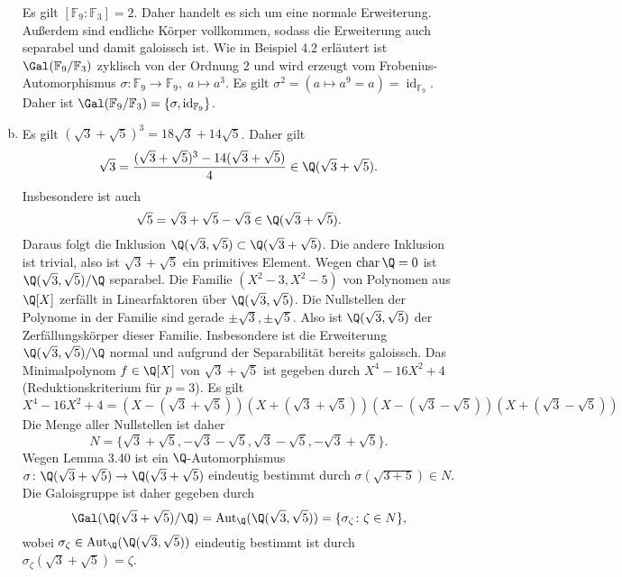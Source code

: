 \documentclass{article}
\begin{document}
\begin{enumerate}[(a)]
        Es gilt $[\mathbb{F}_9\colon \mathbb{F}_3] = 2$. Daher handelt es sich um eine normale Erweiterung. Außerdem sind endliche Körper vollkommen, sodass die Erweiterung auch separabel und damit galoissch ist.
        Wie in Beispiel 4.2 erläutert ist $\Gal(\mathbb{F}_9/\mathbb{F}_3)$ zyklisch von der Ordnung $2$ und wird erzeugt vom Frobenius-Automorphismus $\sigma\colon \mathbb{F}_9 \to \mathbb{F}_9,\; a \mapsto a^3$. Es gilt $\sigma^2 = (a\mapsto a^9 = a) = \operatorname{id}_{\mathbb{F}_9}$. Daher ist $\Gal(\mathbb{F}_9/\mathbb{F}_3) = \{\sigma, \operatorname{id}_{\mathbb{F}_9}\}$.
        \item Es gilt $(\sqrt{3} + \sqrt{5})^3 = 18\sqrt{3} + 14 \sqrt{5}$. 
        Daher gilt $$\sqrt{3} = \frac{(\sqrt{3} + \sqrt{5})^3 - 14(\sqrt{3} + \sqrt{5})}{4} \in \Q(\sqrt{3} + \sqrt{5}).$$ 
        Insbesondere ist auch $$\sqrt{5} = \sqrt{3} + \sqrt{5} - \sqrt{3} \in \Q(\sqrt{3} + \sqrt{5}).$$ Daraus folgt die Inklusion $\Q(\sqrt{3}, \sqrt{5}) \subset \Q(\sqrt{3} + \sqrt{5})$. Die andere Inklusion ist trivial, also ist $\sqrt{3} + \sqrt{5}$ ein primitives Element.
        Wegen $\operatorname{char} \Q = 0$ ist $\Q(\sqrt{3}, \sqrt{5})/\Q$ separabel. 
        Die Familie $(X^2 -3, X^2 - 5)$ von Polynomen aus $\Q[X]$ zerfällt in Linearfaktoren über $\Q(\sqrt{3}, \sqrt{5})$. 
        Die Nullstellen der Polynome in der Familie sind gerade $\pm \sqrt{3}, \pm \sqrt{5}$. Also ist $\Q(\sqrt{3}, \sqrt{5})$ der Zerfällungskörper dieser Familie. 
        Insbesondere ist die Erweiterung $\Q(\sqrt{3}, \sqrt{5})/\Q$ normal und aufgrund der Separabilität bereits galoissch.
        Das Minimalpolynom $f \in \Q[X]$ von $\sqrt{3} + \sqrt{5}$ ist gegeben durch $X^4 - 16X^2 + 4$ (Reduktionskriterium für $p = 3$).
        Es gilt
        \[
            X^4 - 16X^2 + 4 = (X - (\sqrt{3} + \sqrt{5}))(X + (\sqrt{3} + \sqrt{5}))(X - (\sqrt{3} - \sqrt{5}))(X + (\sqrt{3} - \sqrt{5}))
        \]
        Die Menge aller Nullstellen ist daher
        \[
            N = \{\sqrt{3} + \sqrt{5}, -\sqrt{3} -\sqrt{5}, \sqrt{3} - \sqrt{5}, - \sqrt{3} + \sqrt{5}\}.
        \]
        Wegen Lemma 3.40 ist ein $\Q$-Automorphismus $\sigma\colon \Q(\sqrt{3} + \sqrt{5}) \to \Q(\sqrt{3} + \sqrt{5})$ eindeutig bestimmt durch $\sigma(\sqrt{3+5}) \in N$.
        Die Galoisgruppe ist daher gegeben durch
        \[
            \Gal(\Q(\sqrt{3} + \sqrt{5})/\Q) = \operatorname{Aut}_{\Q}(\Q(\sqrt{3}, \sqrt{5})) = \{\sigma_\zeta \colon \zeta \in N\},
        \] wobei $\sigma_\zeta \in \operatorname{Aut}_{\Q}(\Q(\sqrt{3}, \sqrt{5}))$ eindeutig bestimmt ist durch $\sigma_\zeta(\sqrt{3} + \sqrt{5}) = \zeta$.
    \end{enumerate}
\end{document}
